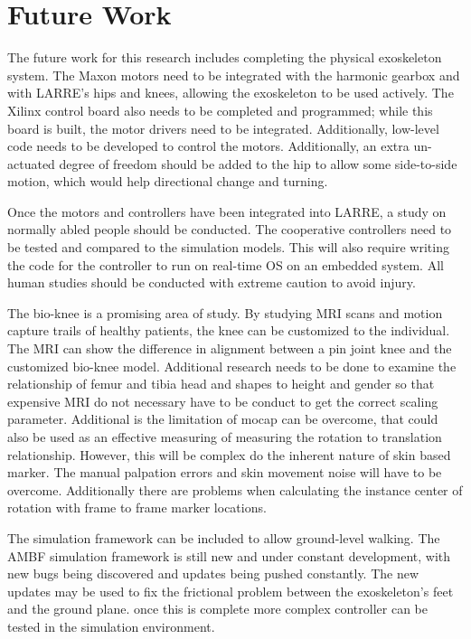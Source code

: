 \chapter{Future Work}

The future work for this research includes completing the physical exoskeleton system. The Maxon motors need to be integrated with the harmonic gearbox and with LARRE's hips and knees, allowing the exoskeleton to be used actively. The Xilinx control board also needs to be completed and programmed; while this board is built, the motor drivers need to be integrated. Additionally, low-level code needs to be developed to control the motors. Additionally, an extra un-actuated degree of freedom should be added to the hip to allow some side-to-side motion, which would help directional change and turning. 

Once the motors and controllers have been integrated into LARRE, a study on normally abled people should be conducted. The cooperative controllers need to be tested and compared to the simulation models. This will also require writing the code for the controller to run on real-time OS on an embedded system. All human studies should be conducted with extreme caution to avoid injury. 

The bio-knee is a promising area of study. By studying MRI scans and motion capture trails of healthy patients, the knee can be customized to the individual. The MRI can show the difference in alignment between a pin joint knee and the customized bio-knee model. Additional research needs to be done to examine the relationship of femur and tibia head and shapes to height and gender so that expensive MRI do not necessary have to be conduct to get the correct scaling parameter. Additional is the limitation of mocap can be overcome, that could also be used as an effective measuring of measuring the rotation to translation relationship. However, this will be complex do the inherent nature of skin based marker. The manual palpation errors and skin movement noise will have to be overcome. Additionally there are problems when calculating the instance center of rotation with frame to frame marker locations.  

The simulation framework can be included to allow ground-level walking. The AMBF simulation framework is still new and under constant development, with new bugs being discovered and updates being pushed constantly. The new updates may be used to fix the frictional problem between the exoskeleton's feet and the ground plane. once this is complete more complex controller can be tested in the simulation environment. 





